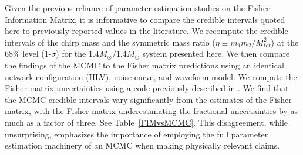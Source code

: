\documentclass[11pt,a4paper]{emulateapj} 
\begin{document}
Given the previous reliance of parameter estimation studies on the Fisher
Information Matrix, it is informative to compare the credible intervals quoted here 
to previously reported values in the literature.  We recompute the credible intervals 
of the chirp mass and the symmetric mass ratio ($\eta \equiv m_1 m_2 / M_{tot}^2$)
at the 68\% level (1-$\sigma$) for the $1.4M_{\odot}/1.4M_{\odot}$ system presented 
here.  We then compare the findings of the MCMC to the Fisher matrix predictions using
an identical network configuration (HLV), noise curve, and waveform model.  
We compute the Fisher matrix uncertainties 
using a code previously described in \cite{Inadequacies}.  We find that the MCMC credible
 intervals vary significantly from
the estimates of the Fisher matrix, with the Fisher matrix underestimating the 
fractional uncertainties by as much as a factor of three.  See Table~\ref{FIMvsMCMC}.
   This disagreement, while 
   unsurprising, emphasizes the importance of employing the full parameter estimation
    machinery of an MCMC when making physically relevant claims.
\end{document}
